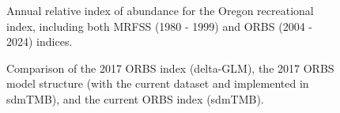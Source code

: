 \documentclass[
]{scrartcl}
\begin{document}
\begin{figure}


\caption{\label{fig-ORBS_index}Annual relative index of abundance for
the Oregon recreational index, including both MRFSS (1980 - 1999) and
ORBS (2004 - 2024) indices.}

\end{figure}%

\clearpage

\begin{figure}


\caption{\label{fig-ORBS_comp}Comparison of the 2017 ORBS index
(delta-GLM), the 2017 ORBS model structure (with the current dataset and
implemented in sdmTMB), and the current ORBS index (sdmTMB).}

\end{figure}%
\end{document}
